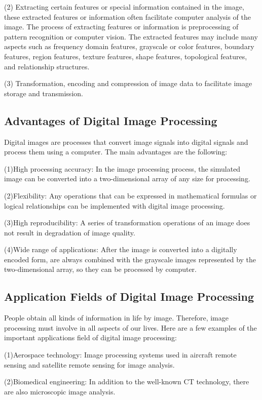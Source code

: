 (2) Extracting certain features or special information contained in the image, these extracted features or information often facilitate computer analysis of the image. The process of extracting features or information is preprocessing of pattern recognition or computer vision. The extracted features may include many aspects such as frequency domain features, grayscale or color features, boundary features, region features, texture features, shape features, topological features, and relationship structures.

(3) Transformation, encoding and compression of image data to facilitate image storage and transmission.
\subsection{Advantages of Digital Image Processing}
Digital images are processes that convert image signals into digital signals and process them using a computer. The main advantages are the following\cite{ref2}:

(1)High processing accuracy: In the image processing process, the simulated image can be converted into a two-dimensional array of any size for processing. 

(2)Flexibility: Any operations that can be expressed in mathematical formulas or logical relationships can be implemented with digital image processing.

(3)High reproducibility: A series of transformation operations of an image does not result in degradation of image quality.

(4)Wide range of applications: After the image is converted into a digitally encoded form, are always combined with the grayscale images represented by the two-dimensional array, so they can be processed by computer. 
\subsection{Application Fields of Digital Image Processing}
People obtain all kinds of information in life by image. Therefore, image processing must involve in all aspects of our lives. Here are a few examples of  the important applications field of digital image processing:  

(1)Aerospace technology: Image processing systems used in aircraft remote sensing and satellite remote sensing for image analysis.

(2)Biomedical engineering: In addition to the well-known CT technology, there are also microscopic image analysis.

